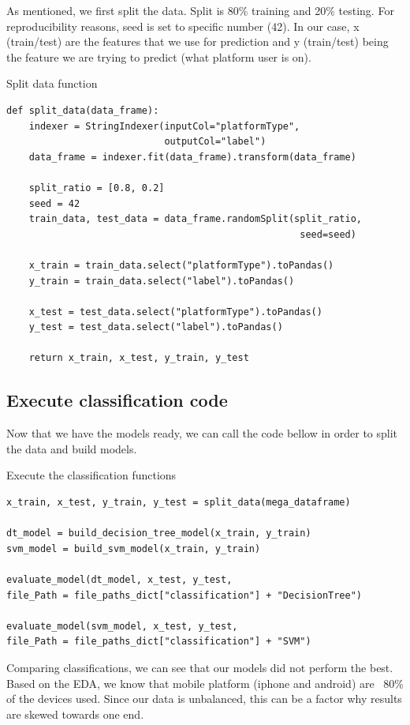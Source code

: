 As mentioned, we first split the data. Split is 80\% training and 20\% testing. For reproducibility reasons, seed is set to specific number (42). In our case, x (train/test) are the features that we use for prediction and y (train/test) being the feature we are trying to predict (what platform user is on).
\begin{listing}[H]
\caption{Split data function}
\begin{verbatim}
def split_data(data_frame):
    indexer = StringIndexer(inputCol="platformType", 
                            outputCol="label")
    data_frame = indexer.fit(data_frame).transform(data_frame)

    split_ratio = [0.8, 0.2]
    seed = 42
    train_data, test_data = data_frame.randomSplit(split_ratio, 
                                                    seed=seed)

    x_train = train_data.select("platformType").toPandas()
    y_train = train_data.select("label").toPandas()

    x_test = test_data.select("platformType").toPandas()
    y_test = test_data.select("label").toPandas()

    return x_train, x_test, y_train, y_test
\end{verbatim}
\end{listing}

\newpage

\newpage


\subsection{Execute classification code}

Now that we have the models ready, we can call the code bellow in order to split the data and build models.

\begin{listing}[H]
\caption{Execute the classification functions}
\begin{verbatim}
x_train, x_test, y_train, y_test = split_data(mega_dataframe)

dt_model = build_decision_tree_model(x_train, y_train)
svm_model = build_svm_model(x_train, y_train)

evaluate_model(dt_model, x_test, y_test, 
file_Path = file_paths_dict["classification"] + "DecisionTree")

evaluate_model(svm_model, x_test, y_test, 
file_Path = file_paths_dict["classification"] + "SVM")

\end{verbatim}
\end{listing}

Comparing classifications, we can see that our models did not perform the best. Based on the EDA, we know that mobile platform (iphone and android) are ~80\% of the devices used. Since our data is unbalanced, this can be a factor why results are skewed towards one end.
